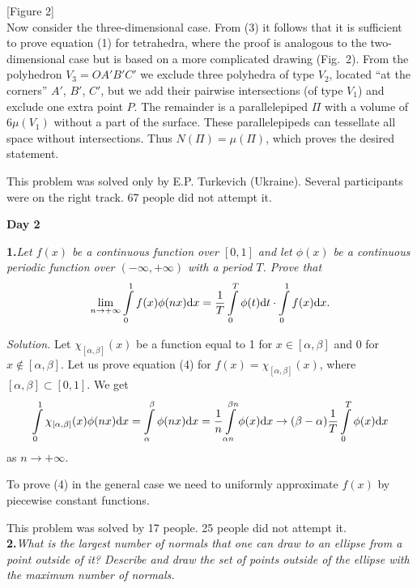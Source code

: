\documentclass[12pt]{amsart}
\begin{document}
[Figure 2]\\

Now consider the three-dimensional case.
From (3) it follows that it is sufficient to prove equation (1) for tetrahedra,
where the proof is analogous to the two-dimensional case but is based on a more
complicated drawing (Fig.~2).
From the polyhedron $V_3=OA'B'C'$ we exclude three polyhedra of type $V_2$,
located ``at the corners'' $A'$, $B'$, $C'$, but we add their pairwise
intersections (of type $V_1$) and exclude one extra point $P$.
The remainder is a parallelepiped $\Pi$ with a volume of $6\mu(V_1)$ without a
part of the surface.
These parallelepipeds can tessellate all space without intersections.
Thus $N(\Pi)=\mu(\Pi)$, which proves the desired statement.

This problem was solved only by E.P. Turkevich (Ukraine).
Several participants were on the right track.
67 people did not attempt it.\\

\centerline{\textbf{Day 2}}

\textbf{1.}\quad\textit{Let $f(x)$ be a continuous function over $[0,1]$ and let
$\phi(x)$ be a continuous periodic function over $(-\infty,+\infty)$ with a
period $T$.
Prove that}
\begin{equation}
\lim_{n\to+\infty}\int\limits_0^1f(x)\phi(nx)\text dx=
\frac1T\int\limits_0^T\phi(t)\text dt\cdot\int\limits_0^1f(x)\text dx.
\end{equation}

\textit{Solution.}
Let $\chi_{[\alpha,\beta]}(x)$ be a function equal to 1 for
$x\in[\alpha,\beta]$ and 0 for $x\notin[\alpha,\beta]$.
Let us prove equation (4) for $f(x)=\chi_{[\alpha,\beta]}(x)$, where
$[\alpha,\beta]\subset[0,1]$.
We get
$$\int\limits_0^1\chi_{[\alpha,\beta]}(x)\phi(nx)\text dx=
\int\limits_\alpha^\beta\phi(nx)\text dx=
\frac1n\int\limits_{\alpha n}^{\beta n}\phi(x)\text dx\to
(\beta-\alpha)\frac1T\int\limits_0^T\phi(x)\text dx$$
as $n\to+\infty$.

To prove (4) in the general case we need to uniformly approximate $f(x)$ by
piecewise constant functions.

This problem was solved by 17 people.
25 people did not attempt it.\\

\textbf{2.}\quad\textit{What is the largest number of normals that one can draw
to an ellipse from a point outside of it?
Describe and draw the set of points outside of the ellipse with the maximum
number of normals.}
\end{document}
